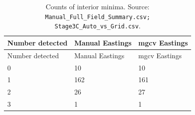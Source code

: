 \begin{longtable}{@{}p{3.4cm}p{3.4cm}p{3.4cm}@{}}
\caption{Counts of interior minima. Source: \texttt{Manual\_Full\_Field\_Summary.csv; Stage3C\_Auto\_vs\_Grid.csv}.}\label{tab:counts-of-interior-minima}\\
\toprule
Number detected & Manual Eastings & mgcv Eastings\\
\midrule
\endfirsthead
\toprule
Number detected & Manual Eastings & mgcv Eastings\\
\midrule
\endhead
0 & 10 & 10\\
1 & 162 & 161\\
2 & 26 & 27\\
3 & 1 & 1\\
\bottomrule
\end{longtable}
